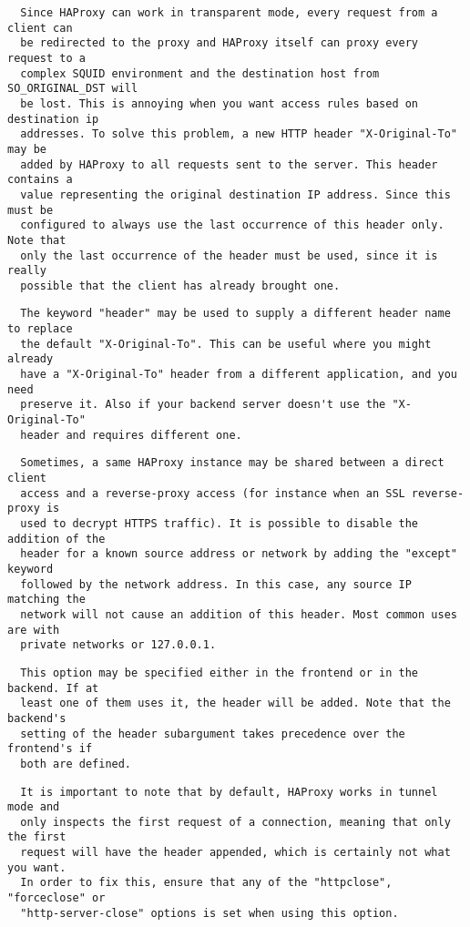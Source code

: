 \begin{verbatim}
  Since HAProxy can work in transparent mode, every request from a client can
  be redirected to the proxy and HAProxy itself can proxy every request to a
  complex SQUID environment and the destination host from SO_ORIGINAL_DST will
  be lost. This is annoying when you want access rules based on destination ip
  addresses. To solve this problem, a new HTTP header "X-Original-To" may be
  added by HAProxy to all requests sent to the server. This header contains a
  value representing the original destination IP address. Since this must be
  configured to always use the last occurrence of this header only. Note that
  only the last occurrence of the header must be used, since it is really
  possible that the client has already brought one.
\end{verbatim}

\begin{verbatim}
  The keyword "header" may be used to supply a different header name to replace
  the default "X-Original-To". This can be useful where you might already
  have a "X-Original-To" header from a different application, and you need
  preserve it. Also if your backend server doesn't use the "X-Original-To"
  header and requires different one.
\end{verbatim}

\begin{verbatim}
  Sometimes, a same HAProxy instance may be shared between a direct client
  access and a reverse-proxy access (for instance when an SSL reverse-proxy is
  used to decrypt HTTPS traffic). It is possible to disable the addition of the
  header for a known source address or network by adding the "except" keyword
  followed by the network address. In this case, any source IP matching the
  network will not cause an addition of this header. Most common uses are with
  private networks or 127.0.0.1.
\end{verbatim}

\begin{verbatim}
  This option may be specified either in the frontend or in the backend. If at
  least one of them uses it, the header will be added. Note that the backend's
  setting of the header subargument takes precedence over the frontend's if
  both are defined.
\end{verbatim}

\begin{verbatim}
  It is important to note that by default, HAProxy works in tunnel mode and
  only inspects the first request of a connection, meaning that only the first
  request will have the header appended, which is certainly not what you want.
  In order to fix this, ensure that any of the "httpclose", "forceclose" or
  "http-server-close" options is set when using this option.
\end{verbatim}

